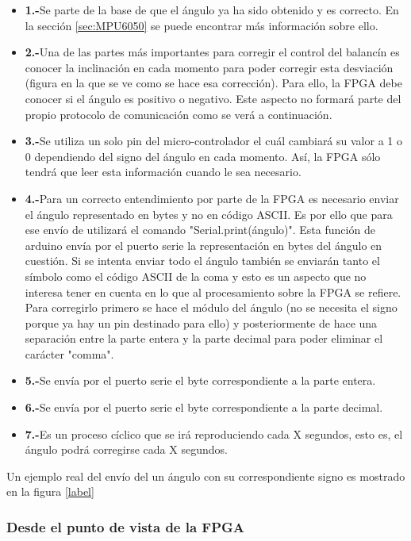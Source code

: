 \begin{itemize}
	\item \textbf{1.-}Se parte de la base de que el ángulo ya ha sido obtenido y es correcto. En la sección \ref{sec:MPU6050} se puede encontrar más información sobre ello.
	\item \textbf{2.-}Una de las partes más importantes para corregir el control del balancín es conocer la inclinación en cada momento para poder corregir esta desviación (figura en la que se ve como se hace esa corrección). Para ello, la FPGA debe conocer si el ángulo es positivo o negativo. Este aspecto no formará parte del propio protocolo de comunicación como se verá a continuación.
	\item \textbf{3.-}Se utiliza un solo pin del micro-controlador el cuál cambiará su valor a 1 o 0 dependiendo del signo del ángulo en cada momento. Así, la FPGA sólo tendrá que leer esta información cuando le sea necesario.
	\item \textbf{4.-}Para un correcto entendimiento por parte de la FPGA es necesario enviar el ángulo representado en bytes y no en código ASCII. Es por ello que para ese envío de utilizará el comando "Serial.print(ángulo)". Esta función de arduino envía por el puerto serie la representación en bytes del ángulo en cuestión.\newline
	Si se intenta enviar todo el ángulo también se enviarán tanto el símbolo como el código ASCII de la coma y esto es un aspecto que no interesa tener en cuenta en lo que al procesamiento sobre la FPGA se refiere. Para corregirlo primero se hace el módulo del ángulo (no se necesita el signo porque ya hay un pin destinado para ello) y posteriormente de hace una separación entre la parte entera y la parte decimal para poder eliminar el carácter "comma". 
	
	\item \textbf{5.-}Se envía por el puerto serie el byte correspondiente a la parte entera. 
	\item \textbf{6.-}Se envía por el puerto serie el byte correspondiente a la parte decimal. 
	\item \textbf{7.-}Es un proceso cíclico que se irá reproduciendo cada X segundos, esto es, el ángulo podrá corregirse cada X segundos. 
\end{itemize}
Un ejemplo real del envío del un ángulo con su correspondiente signo es mostrado en la figura \ref{label}

\subsubsection{Desde el punto de vista de la FPGA} \newline

